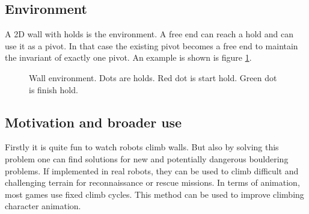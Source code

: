 \documentclass[12pt]{article}
\begin{document}
\subsection{Environment}
A 2D wall with holds is the environment.
A free end can reach a hold and can use it as a pivot.
In that case the existing pivot becomes a free end to maintain the invariant of exactly one pivot.
An example is shown is figure \ref{fig:3}.
\begin{figure}[h!]
    \centering
    \caption{Wall environment. Dots are holds. Red dot is start hold. Green dot is finish hold.}
    \label{fig:3}
\end{figure}

\subsection{Motivation and broader use}
Firstly it is quite fun to watch robots climb walls.
But also by solving this problem one can find solutions for new and potentially dangerous bouldering problems.
If implemented in real robots, they can be used to climb difficult and challenging terrain for reconnaissance or rescue missions.
In terms of animation, most games use fixed climb cycles.
This method can be used to improve climbing character animation.
\end{document}
